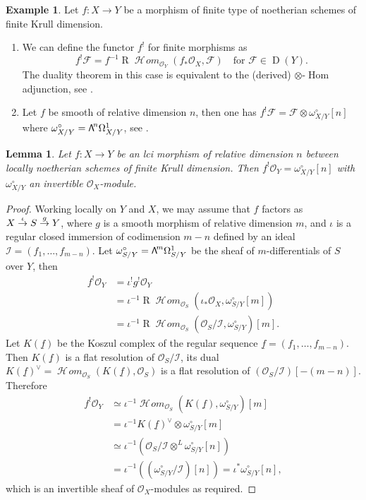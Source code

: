 \documentclass[11pt]{article}
\newcommand\bw[1]{\mathbin{\hbox{$\mathsf{\Lambda}$}^{\!#1}}}
\newcommand\To[1]{\mathchoice{\xrightarrow{\textstyle\kern4pt#1\kern3pt}}{\stackrel{#1}{\to}}{}{}}
\numberwithin{equation}{section}
\newtheorem{lem}[prop]{Lemma}
\theoremstyle{definition}
\newtheorem{exam}[prop]{Example}
\newcommand{\n}[1]{\mathcal{#1}}
\newcommand{\s}[1]{\mathscr{#1}}
\DeclareMathOperator{\R}{R}
\DeclareMathOperator{\D}{D}
\DeclareMathOperator{\Hom}{Hom}
\DeclareMathOperator{\sHom}{\s{H}\!\mathit{om}}
\begin{document}
\begin{exam}
\label{ExampleDualizingSheaf}
Let $f:X\to Y$ be a morphism of finite type of noetherian schemes of finite Krull dimension.
\begin{enumerate}
\item\label{ExampleDualizingSheaf1} We can define the functor $f^!$ for finite morphisms as
\[
f^!\n{F}=f^{-1} \R \sHom_{\n{O}_Y}(f_*\s{O}_X, \n{F}) \quad\text{for } \n{F}\in \D(Y).
\]
The duality theorem in this case is equivalent to the (derived) $\otimes$-$\Hom$ adjunction, see \cite[\S III.6]{hartshorne1966residues}.

\item\label{ExampleDualizingSheaf2} Let $f$ be smooth of relative dimension $n$, then one has $f^!\n{F}=\n{F}\otimes \omega_{X/Y}^{\circ}[n]$ where $\omega_{X/Y}^{\circ}=\bw{n} \Omega^1_{X/Y}$, see \cite[\S III.2]{hartshorne1966residues}.
\end{enumerate}
\end{exam}

\begin{lem}
\label{fOy}
Let $f: X\to Y$ be an lci morphism of relative dimension $n$ between locally noetherian schemes of finite Krull dimension. Then $f^!\s{O}_Y = \omega^{\circ}_{X/Y}[n]$ with $\omega^{\circ}_{X/Y}$ an invertible $\s{O}_X$-module.
\end{lem}

\begin{proof}
Working locally on $Y$ and $X$, we may assume that $f$ factors as $X \To{\iota} S \To{g} Y$, where $g$ is a smooth morphism of relative dimension $m$, and $\iota$ is a regular closed immersion of codimension $m-n$ defined by an ideal $\s{I}=(f_1,\ldots, f_{m-n})$. Let $\omega^{\circ}_{S/Y}=\bw{m}\Omega^{1}_{S/Y}$ be the sheaf of $m$-differentials of $S$ over $Y$, then
\begin{align*}
f^!\s{O}_Y & = \iota^! g^! \s{O}_Y \\
		 & = \iota^{-1} \R \sHom_{\s{O}_S}(\iota_* \s{O}_X, \omega_{S/Y}^\circ[m]) \\
		 & = \iota^{-1} \R \sHom_{\s{O}_S}(\s{O}_S/\s{I}, \omega_{S/Y}^\circ)[m].
\end{align*}
Let $K(\underline{f})$ be the Koszul complex of the regular sequence $\underline{f}=(f_1,\ldots, f_{m-n})$. Then $K(\underline{f})$ is a flat resolution of $\s{O}_S/\s{I}$, its dual $K(\underline{f})^\vee=\sHom_{\s{O}_S}(K(\underline{f}), \s{O}_S)$ is a flat resolution of \mbox{\((\s{O}_S/\s{I})[-(m-n)]\)}. Therefore
\begin{align*}
f^!\s{O}_Y & \simeq \iota^{-1} \sHom_{\s{O}_S}(K(\underline{f}), \omega^\circ_{S/Y})[m] \\
		 & = \iota^{-1} K(\underline{f})^\vee \otimes \omega^\circ_{S/Y} [m] \\
		 & \simeq \iota^{-1}(\s{O}_{S}/\s{I}\otimes ^L \omega^\circ_{S/Y}[n]) \\
		 & = \iota^{-1}((\omega^\circ_{S/Y}/\s{I})[n]) = \iota^* \omega^{\circ}_{S/Y}[n],
\end{align*}
which is an invertible sheaf of $\s{O}_X$-modules as required.
\end{proof}
\end{document}
